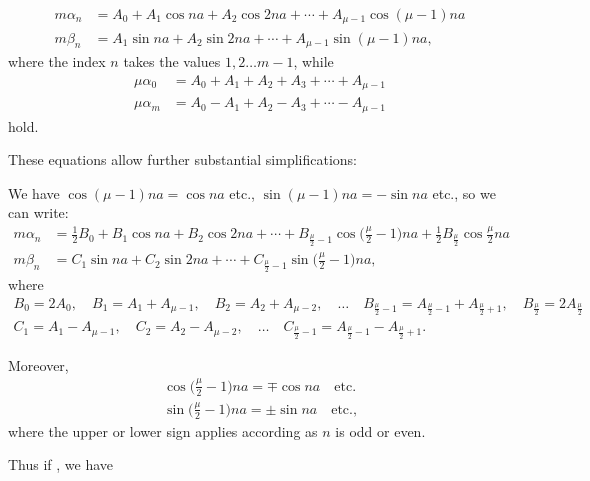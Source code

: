 \begin{landscape}
\[\begin{aligned}
m\alpha_n &= A_0 + A_1\cos na + A_2\cos 2na + \cdots + A_{\mu-1}\cos(\mu-1)na\\
m\beta_n &= A_1\sin na + A_2\sin 2na + \cdots + A_{\mu-1}\sin(\mu-1)na,
\end{aligned}
\]
where the index \(n\) takes the values \(1, 2 \ldots m-1\), while
\[
\begin{aligned}
\mu\alpha_0 &= A_0 + A_1 + A_2 + A_3 + \cdots + A_{\mu-1}\\
\mu\alpha_m &= A_0 - A_1 + A_2 - A_3 + \cdots - A_{\mu-1}
\end{aligned}
\]
hold.
\par\noindent\hspace*{\parindent}These equations allow further substantial simplifications:
\par\noindent\hspace*{\parindent}We have \(\cos(\mu-1)na = \cos na\) etc., \(\sin(\mu-1)na = -\sin na\) etc., so we can write:
\[
\begin{aligned}
m\alpha_n &= \tfrac12 B_0 + B_1\cos na + B_2\cos 2na + \cdots + B_{\frac{\mu}{2}-1}\cos\Big(\frac{\mu}{2}-1\Big)na + \tfrac12 B_{\frac{\mu}{2}}\cos\frac{\mu}{2}na\\
m\beta_n &= C_1\sin na + C_2\sin 2na + \cdots + C_{\frac{\mu}{2}-1}\sin\Big(\frac{\mu}{2}-1\Big)na,
\end{aligned}
\]
where
\[
\begin{gathered}
B_0 = 2A_0,\quad B_1 = A_1+A_{\mu-1},\quad B_2 = A_2+A_{\mu-2},\quad \ldots\quad B_{\frac{\mu}{2}-1} = A_{\frac{\mu}{2}-1}+A_{\frac{\mu}{2}+1},\quad B_{\frac{\mu}{2}} = 2A_{\frac{\mu}{2}}\\[4pt]
C_1 = A_1-A_{\mu-1},\quad C_2 = A_2-A_{\mu-2},\quad \ldots\quad C_{\frac{\mu}{2}-1} = A_{\frac{\mu}{2}-1}-A_{\frac{\mu}{2}+1}.
\end{gathered}
\]
\par\noindent\hspace*{\parindent}Moreover,
\[
\begin{gathered}
\cos\Big(\frac{\mu}{2}-1\Big)na = \mp\cos na \quad \text{etc.}\\[4pt]
\sin\Big(\frac{\mu}{2}-1\Big)na = \pm\sin na \quad \text{etc.,}
\end{gathered}
\]
where the upper or lower sign applies according as \(n\) is odd or even.
\par\noindent\hspace*{\parindent}Thus if , we have

\end{landscape}
